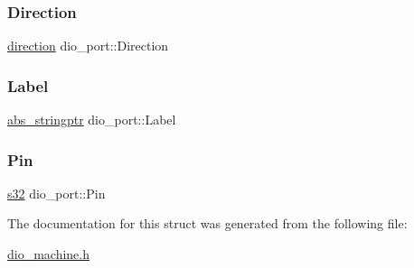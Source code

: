 \subsubsection{\texorpdfstring{Direction}{Direction}}
{\footnotesize\ttfamily \hyperlink{adsio_8h_a99f26e6ee9fcd62f75203b5402df8098}{direction} dio\+\_\+port\+::\+Direction}

\mbox{\label{structdio__port_a9135b29613e9dee6b732d3662764f4a2}} 
\subsubsection{\texorpdfstring{Label}{Label}}
{\footnotesize\ttfamily \hyperlink{structabs__stringptr}{abs\+\_\+stringptr} dio\+\_\+port\+::\+Label}

\mbox{\label{structdio__port_a4cad63c96a1b03d4e85d107781a119c7}} 
\subsubsection{\texorpdfstring{Pin}{Pin}}
{\footnotesize\ttfamily \hyperlink{ab__common_8h_ae9b1af5c037e57a98884758875d3a7c4}{s32} dio\+\_\+port\+::\+Pin}



The documentation for this struct was generated from the following file\+:\begin{DoxyCompactItemize}
\item 
\hyperlink{dio__machine_8h}{dio\+\_\+machine.\+h}\end{DoxyCompactItemize}
